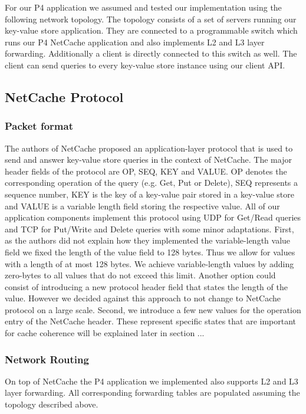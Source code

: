 \documentclass[11pt,oneside,a4paper]{article}
\begin{document}
For our P4 application we assumed and tested our implementation using the following network topology.
The topology consists of a set of servers running our key-value store application.
They are connected to a programmable switch which runs our P4 NetCache application and also implements L2 and L3 layer forwarding.
Additionally a client is directly connected to this switch as well.
The client can send queries to every key-value store instance using our client API.

\subsection{NetCache Protocol}

\subsubsection{Packet format}

The authors of NetCache proposed an application-layer protocol that is used to send and answer key-value store queries in the context of NetCache.
The major header fields of the protocol are OP, SEQ, KEY and VALUE.
OP denotes the corresponding operation of the query (e.g. Get, Put or Delete), SEQ represents a sequence number, KEY is the key of a key-value pair stored in a key-value store and VALUE is a variable length field storing the respective value.
All of our application components implement this protocol using UDP for Get/Read queries and TCP for Put/Write and Delete queries with some minor adaptations.
First, as the authors did not explain how they implemented the variable-length value field we fixed the length of the value field to 128 bytes.
Thus we allow for values with a length of at most 128 bytes.
We achieve variable-length values by adding zero-bytes to all values that do not exceed this limit.
Another option could consist of introducing a new protocol header field that states the length of the value.
However we decided against this approach to not change to NetCache protocol on a large scale.
Second, we introduce a few new values for the operation entry of the NetCache header.
These represent specific states that are important for cache coherence will be explained later in section ...


\subsubsection{Network Routing}

On top of NetCache the P4 application we implemented also supports L2 and L3 layer forwarding.
All corresponding forwarding tables are populated assuming the topology described above.
\end{document}
